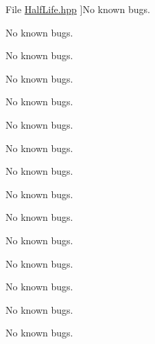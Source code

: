 \begin{DoxyRefList}
%
File \hyperlink{_half_life_8hpp}{Half\+Life.hpp} ]No known bugs.  
\item[\label{bug__bug000024}%
\Hypertarget{bug__bug000024}%
File \hyperlink{_half_life_8inl}{Half\+Life.inl} ]No known bugs.  
\item[\label{bug__bug000031}%
\Hypertarget{bug__bug000031}%
File \hyperlink{_kinematics_8hpp}{Kinematics.hpp} ]No known bugs.  
\item[\label{bug__bug000032}%
\Hypertarget{bug__bug000032}%
File \hyperlink{_kinematics_constants_8hpp}{Kinematics\+Constants.hpp} ]No known bugs.  
\item[\label{bug__bug000041}%
\Hypertarget{bug__bug000041}%
File \hyperlink{_lorentz_transformations_8hpp}{Lorentz\+Transformations.hpp} ]No known bugs.  
\item[\label{bug__bug000042}%
\Hypertarget{bug__bug000042}%
File \hyperlink{_lorentz_transformations_8inl}{Lorentz\+Transformations.inl} ]No known bugs.  
\item[\label{bug__bug000011}%
\Hypertarget{bug__bug000011}%
File \hyperlink{_luminosity_8hpp}{Luminosity.hpp} ]No known bugs.  
\item[\label{bug__bug000012}%
\Hypertarget{bug__bug000012}%
File \hyperlink{_luminosity_8inl}{Luminosity.inl} ]No known bugs.  
\item[\label{bug__bug000033}%
\Hypertarget{bug__bug000033}%
File \hyperlink{_optics_8hpp}{Optics.hpp} ]No known bugs.  
\item[\label{bug__bug000034}%
\Hypertarget{bug__bug000034}%
File \hyperlink{_optics_constants_8hpp}{Optics\+Constants.hpp} ]No known bugs.  
\item[\label{bug__bug000013}%
\Hypertarget{bug__bug000013}%
File \hyperlink{_orbital_charecteristics_8hpp}{Orbital\+Charecteristics.hpp} ]No known bugs.  
\item[\label{bug__bug000014}%
\Hypertarget{bug__bug000014}%
File \hyperlink{_orbital_charecteristics_8inl}{Orbital\+Charecteristics.inl} ]No known bugs.  
\item[\label{bug__bug000009}%
\Hypertarget{bug__bug000009}%
File \hyperlink{_periapsis_8hpp}{Periapsis.hpp} ]No known bugs. 

No known bugs.  
\item[\label{bug__bug000010}%
\Hypertarget{bug__bug000010}%
File \hyperlink{_periapsis_8inl}{Periapsis.inl} ]No known bugs. 


\end{DoxyRefList}
